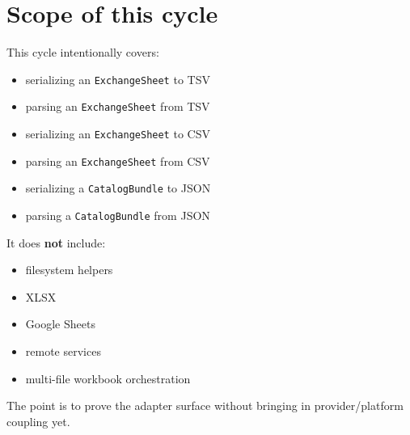 \section{Scope of this cycle}\label{record-191-scope-of-this-cycle}

This cycle intentionally covers:

\begin{itemize}
\tightlist
\item
  serializing an \texttt{E\allowbreak{}x\allowbreak{}c\allowbreak{}h\allowbreak{}a\allowbreak{}n\allowbreak{}g\allowbreak{}e\allowbreak{}S\allowbreak{}h\allowbreak{}e\allowbreak{}e\allowbreak{}t} to TSV
\item
  parsing an \texttt{E\allowbreak{}x\allowbreak{}c\allowbreak{}h\allowbreak{}a\allowbreak{}n\allowbreak{}g\allowbreak{}e\allowbreak{}S\allowbreak{}h\allowbreak{}e\allowbreak{}e\allowbreak{}t} from TSV
\item
  serializing an \texttt{E\allowbreak{}x\allowbreak{}c\allowbreak{}h\allowbreak{}a\allowbreak{}n\allowbreak{}g\allowbreak{}e\allowbreak{}S\allowbreak{}h\allowbreak{}e\allowbreak{}e\allowbreak{}t} to CSV
\item
  parsing an \texttt{E\allowbreak{}x\allowbreak{}c\allowbreak{}h\allowbreak{}a\allowbreak{}n\allowbreak{}g\allowbreak{}e\allowbreak{}S\allowbreak{}h\allowbreak{}e\allowbreak{}e\allowbreak{}t} from CSV
\item
  serializing a \texttt{C\allowbreak{}a\allowbreak{}t\allowbreak{}a\allowbreak{}l\allowbreak{}o\allowbreak{}g\allowbreak{}B\allowbreak{}u\allowbreak{}n\allowbreak{}d\allowbreak{}l\allowbreak{}e} to JSON
\item
  parsing a \texttt{C\allowbreak{}a\allowbreak{}t\allowbreak{}a\allowbreak{}l\allowbreak{}o\allowbreak{}g\allowbreak{}B\allowbreak{}u\allowbreak{}n\allowbreak{}d\allowbreak{}l\allowbreak{}e} from JSON
\end{itemize}

It does \textbf{not} include:

\begin{itemize}
\tightlist
\item
  filesystem helpers
\item
  XLSX
\item
  Google Sheets
\item
  remote services
\item
  multi-file workbook orchestration
\end{itemize}

The point is to prove the adapter surface without bringing in provider/platform coupling yet.

